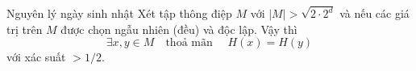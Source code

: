 \begin{frame}
	\begin{block}{Nguyên lý ngày sinh nhật}
		Xét tập thông điệp $M$ với $|M|> \sqrt{2\cdot 2^d}$ và nếu các giá trị trên $M$ được chọn ngẫu nhiên (đều) và độc lập. Vậy thì
		\[
			\exists x, y \in M\quad  \text{thoả mãn }\quad H(x) = H(y)
		\]
		với xác suất $> 1/2$.
	\end{block}
\end{frame}





